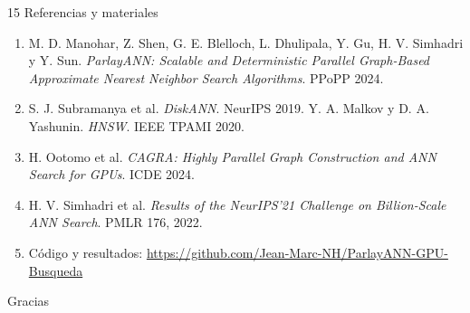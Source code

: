 \documentclass[aspectratio=169,10pt]{beamer}
\begin{document}
\begin{frame}{15 \quad Referencias y materiales}
  \footnotesize
  \begin{enumerate}
    \item M. D. Manohar, Z. Shen, G. E. Blelloch, L. Dhulipala, Y. Gu, H. V. Simhadri y Y. Sun.
          \textit{ParlayANN: Scalable and Deterministic Parallel Graph-Based Approximate
          Nearest Neighbor Search Algorithms}. PPoPP 2024.
    \item S. J. Subramanya et al. \textit{DiskANN}. NeurIPS 2019. \quad
          Y. A. Malkov y D. A. Yashunin. \textit{HNSW}. IEEE TPAMI 2020.
    \item H. Ootomo et al. \textit{CAGRA: Highly Parallel Graph Construction and ANN Search
          for GPUs}. ICDE 2024.
    \item H. V. Simhadri et al. \textit{Results of the NeurIPS'21 Challenge on Billion-Scale
          ANN Search}. PMLR 176, 2022.
    \item Código y resultados: \url{https://github.com/Jean-Marc-NH/ParlayANN-GPU-Busqueda}
  \end{enumerate}
  \vfill
  \centering
  {\Large\color{azul} Gracias}
  \vfill
\end{frame}
\end{document}
